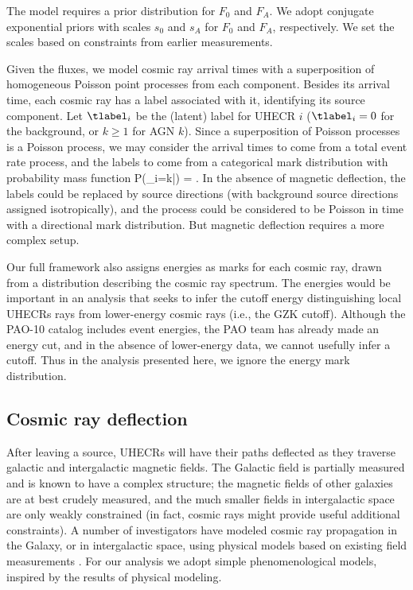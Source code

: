 The model requires a prior distribution for $F_0$ and $F_A$.
We adopt conjugate exponential priors with scales $s_0$ and $s_A$ for
$F_0$ and $F_A$, respectively.  We set the scales based on constraints
from earlier measurements.


Given the fluxes, we model cosmic ray arrival times with a superposition of
homogeneous Poisson point processes from each component.  Besides its
arrival time, each cosmic ray has a label associated with it, identifying
its source component.  Let $\tlabel_i$ be the (latent) label for UHECR
$i$ ($\tlabel_i = 0$ for the background, or $k \ge 1$ for AGN $k$).  Since
a superposition of Poisson processes is a Poisson process, we may consider
the arrival times to come from a total event rate process, and the labels
to come from a categorical mark distribution with probability mass function
\be
P(\lambda_i=k|\Fvec) = .
\label{label-pmf}
\ee
In the absence of magnetic deflection, the labels could be replaced by
source directions (with background source directions assigned
isotropically), and the process could be considered to be Poisson in time
with a directional mark distribution.  But magnetic deflection requires a
more complex setup.

Our full framework also assigns energies as marks for each cosmic ray, drawn
from a distribution describing the cosmic ray spectrum.  The energies would
be important in an analysis that seeks to infer the cutoff energy
distinguishing local UHECRs rays from lower-energy cosmic rays (i.e., the
GZK cutoff).  Although the PAO-10 catalog includes event energies, the PAO
team has already made an energy cut, and in the absence of lower-energy
data, we cannot usefully infer a cutoff.  Thus in the analysis presented
here, we ignore the energy mark distribution.

\subsection{Cosmic ray deflection}

After leaving a source, UHECRs will have their paths deflected as they
traverse galactic and intergalactic magnetic fields.  The Galactic field is
partially measured and is known to have a complex structure; the magnetic
fields of other galaxies are at best crudely measured, and the much smaller
fields in intergalactic space are only weakly constrained (in fact, cosmic
rays might provide useful additional constraints).  A number of
investigators have modeled cosmic ray propagation in the Galaxy, or in
intergalactic space, using physical models based on existing field
measurements \cite{2010A&A...523A..49N,PhysRevD.82.043002,2010ApJ...719..459J}.
For our analysis we adopt simple
phenomenological models, inspired by the results of physical modeling.

